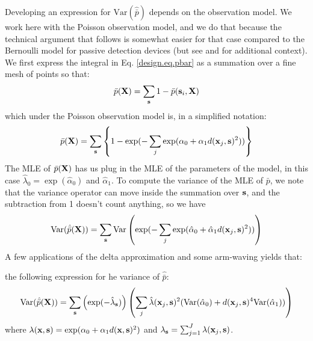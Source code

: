 Developing an expression for $\mbox{Var}(\hat{\bar{p}})$ depends on
the observation model. 
We work here with the Poisson observation model, and we do that
because the technical argument that follows is somewhat easier for
that case compared to the Bernoulli model for passive detection
devices (but see
\citet{huggins:1989} and \citet{alho:1990} for additional context). 
We first express the integral in Eq.
\ref{design.eq.pbar} as a summation over a fine mesh of points so
that:
\[
 \bar{p}({\bf X}) = \sum_{{\bf s}} 1 - \bar{p}({\bf s}_{i},{\bf X})
\]
which under the Poisson observation model is, in a simplified notation:
\[
 \bar{p}({\bf X}) = \sum_{{\bf s}} \left\{
1 -  \exp(- \sum_{j}
 \exp(\alpha_{0} + \alpha_{1}  d({\bf x}_{j}, {\bf s})^2))
\right\}
\]
The MLE of $\bar{p}({\bf X})$ has us plug in the MLE of the parameters
of the model, in this case $\hat{\lambda}_{0} = \exp(
\hat{\alpha}_{0})$ and $\hat{\alpha}_{1}$. 
To compute the variance of the MLE of $\bar{p}$, we note that the
variance operator can move inside the summation over ${\bf s}$, and
the subtraction from 1 doesn't count anything, so we have
\[
\mbox{Var}( \hat{\bar{p}}({\bf X}) ) = \sum_{{\bf s}} \mbox{Var}
\left( \exp(- \sum_{j} \exp(\hat{\alpha}_{0} + \hat{\alpha}_{1} d({\bf
    x}_{j}, {\bf s})^2)) \right)
\]
A few applications of the delta approximation and some arm-waving yields that:

the following expression for he variance of
$\hat{\bar{p}}$:
\[
\mbox{Var}( \hat{\bar{p}}({\bf X}) )  =
\sum_{{\bf s}} \left( \exp( - \hat{\lambda}_{\bf s} )  \right)
\left(    \sum_{j}  \hat{\lambda}({\bf x}_{j},{\bf s})^{2} (
 \mbox{Var}( \hat{\alpha}_{0}) +
  d({\bf x}_{j}, {\bf    s})^4
\mbox{Var}( \hat{\alpha}_{1})  )
  \right)
\]
where $\lambda({\bf x},{\bf s}) = \exp( \alpha_{0} + \alpha_{1} d({\bf
  x},{\bf s})^{2})$ and $\lambda_{\bf s} = \sum_{j=1}^{J} \lambda({\bf
  x}_{j},{\bf s})$.


